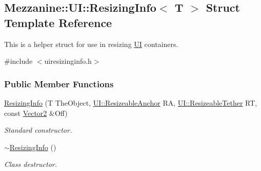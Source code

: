 \hypertarget{structMezzanine_1_1UI_1_1ResizingInfo}{
\subsection{Mezzanine::UI::ResizingInfo$<$ T $>$ Struct Template Reference}
\label{structMezzanine_1_1UI_1_1ResizingInfo}
}


This is a helper struct for use in resizing \hyperlink{namespaceMezzanine_1_1UI}{UI} containers.  




{\ttfamily \#include $<$uiresizinginfo.h$>$}

\subsubsection*{Public Member Functions}
\begin{DoxyCompactItemize}
\item 
\hyperlink{structMezzanine_1_1UI_1_1ResizingInfo_a09f47f02dd062fa65c0a76ba0bc72b3e}{ResizingInfo} (T TheObject, \hyperlink{namespaceMezzanine_1_1UI_a1c571649db3aa98f4e16285b5b754928}{UI::ResizeableAnchor} RA, \hyperlink{namespaceMezzanine_1_1UI_a0334e290e4c9f6a5468fbe11164a17b9}{UI::ResizeableTether} RT, const \hyperlink{classMezzanine_1_1Vector2}{Vector2} \&Off)
\begin{DoxyCompactList}\small\item\em Standard constructor. \item\end{DoxyCompactList}\item 
\hypertarget{structMezzanine_1_1UI_1_1ResizingInfo_a0d3d16791b4885ad7b21d924cb09c7a1}{
\hyperlink{structMezzanine_1_1UI_1_1ResizingInfo_a0d3d16791b4885ad7b21d924cb09c7a1}{$\sim$ResizingInfo} ()}
\label{structMezzanine_1_1UI_1_1ResizingInfo_a0d3d16791b4885ad7b21d924cb09c7a1}

\begin{DoxyCompactList}\small\item\em Class destructor. \item\end{DoxyCompactList}\end{DoxyCompactItemize}

